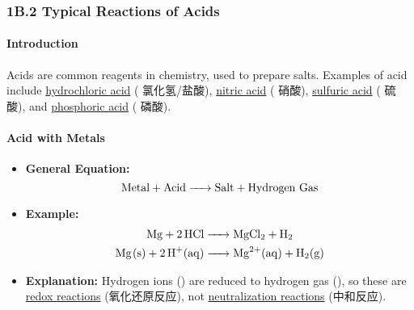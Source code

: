 
\subsubsection{1B.2 Typical Reactions of Acids}
\paragraph{Introduction} Acids are common reagents in chemistry, used to prepare salts. Examples of acid include
\underline{hydrochloric acid} ( 氯化氢/盐酸), \underline{nitric acid} ( 硝酸),
\underline{sulfuric acid} ( 硫酸), and \underline{phosphoric acid} ( 磷酸).

\paragraph{Acid with Metals}
\begin{itemize}
    \item \textbf{General Equation:}
    \begin{equation}
        \ce{\text{Metal} + \text{Acid} -> \text{Salt} + \text{Hydrogen Gas}}
    \end{equation}
    \item \textbf{Example:}
    \begin{equation}
        \begin{split}
            \ce{Mg + 2HCl &-> MgCl2 + H2}\\
            \ce{Mg(s) + 2H+(aq) &-> Mg^{2+}(aq) + H2(g)}
        \end{split}
    \end{equation}
    \item \textbf{Explanation:} Hydrogen ions () are reduced to hydrogen gas (), so these are
    \underline{redox reactions} (氧化还原反应), not \underline{neutralization reactions} (中和反应).
\end{itemize}


